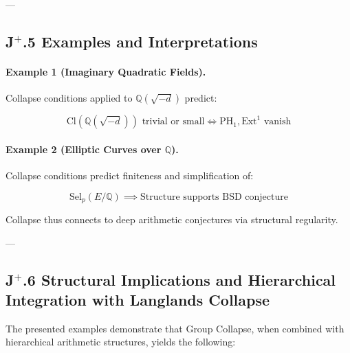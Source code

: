 \documentclass[11pt]{article}
\begin{document}
---

\subsection*{J$^{+}$.5 Examples and Interpretations}

\paragraph{Example 1 (Imaginary Quadratic Fields).}

Collapse conditions applied to $\mathbb{Q}(\sqrt{-d})$ predict:

\[
\mathrm{Cl}(\mathbb{Q}(\sqrt{-d})) \text{ trivial or small} \iff \mathrm{PH}_1, \mathrm{Ext}^1 \text{ vanish}
\]

\paragraph{Example 2 (Elliptic Curves over $\mathbb{Q}$).}

Collapse conditions predict finiteness and simplification of:

\[
\mathrm{Sel}_p(E/\mathbb{Q}) \implies \text{Structure supports BSD conjecture}
\]

Collapse thus connects to deep arithmetic conjectures via structural regularity.

---

\subsection*{J$^{+}$.6 Structural Implications and Hierarchical Integration with Langlands Collapse}

The presented examples demonstrate that Group Collapse, when combined with hierarchical arithmetic structures, yields the following:
\end{document}
